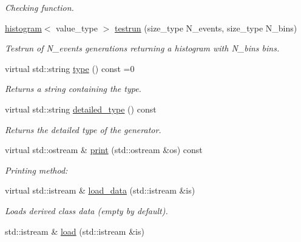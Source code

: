 \begin{DoxyCompactItemize}
\begin{DoxyCompactList}\small\item\em Checking function. \end{DoxyCompactList}\item 
\hyperlink{a00280}{histogram}$<$ value\-\_\-type $>$ \hyperlink{a00482_a786580df63347f2c9bf4181c662c44aa}{testrun} (size\-\_\-type N\-\_\-events, size\-\_\-type N\-\_\-bins)
\begin{DoxyCompactList}\small\item\em Testrun of N\-\_\-events generations returning a histogram with N\-\_\-bins bins. \end{DoxyCompactList}\item 
\hypertarget{a00482_a037d19ce9dba1dc7ef8ca18e817b4eb4}{virtual std\-::string \hyperlink{a00482_a037d19ce9dba1dc7ef8ca18e817b4eb4}{type} () const =0}\label{a00482_a037d19ce9dba1dc7ef8ca18e817b4eb4}

\begin{DoxyCompactList}\small\item\em Returns a string containing the type. \end{DoxyCompactList}\item 
\hypertarget{a00482_a4ef2375483e129d59da62fc92a4b327b}{virtual std\-::string \hyperlink{a00482_a4ef2375483e129d59da62fc92a4b327b}{detailed\-\_\-type} () const }\label{a00482_a4ef2375483e129d59da62fc92a4b327b}

\begin{DoxyCompactList}\small\item\em Returns the detailed type of the generator. \end{DoxyCompactList}\item 
\hypertarget{a00482_a559a6751fcb3a4ab2a6add0e3c63f6ce}{virtual std\-::ostream \& \hyperlink{a00482_a559a6751fcb3a4ab2a6add0e3c63f6ce}{print} (std\-::ostream \&os) const }\label{a00482_a559a6751fcb3a4ab2a6add0e3c63f6ce}

\begin{DoxyCompactList}\small\item\em Printing method\-: \end{DoxyCompactList}\item 
\hypertarget{a00482_a64a14ad72b1e8fd9eb3bb2b2aa891a2b}{virtual std\-::istream \& \hyperlink{a00482_a64a14ad72b1e8fd9eb3bb2b2aa891a2b}{load\-\_\-data} (std\-::istream \&is)}\label{a00482_a64a14ad72b1e8fd9eb3bb2b2aa891a2b}

\begin{DoxyCompactList}\small\item\em Loads derived class data (empty by default). \end{DoxyCompactList}\item 
\hypertarget{a00482_a0943542e515d2c4bdfd647c722948924}{std\-::istream \& \hyperlink{a00482_a0943542e515d2c4bdfd647c722948924}{load} (std\-::istream \&is)}\label{a00482_a0943542e515d2c4bdfd647c722948924}


\end{DoxyCompactItemize}
